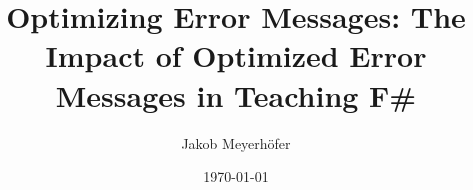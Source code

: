     \title{Optimizing Error Messages: The Impact of Optimized Error Messages in Teaching F\#}

    \author{Jakob Meyerhöfer}

    \date{\today}

    \newcommand{\examinerA}{Prof. Dr. Ralf Hinze}
    \newcommand{\examinerB}{Sebastian Schloßer, M.Sc. (Sebastian Schweizer)}

    \newcommand{\thesisType}{Bachelor}